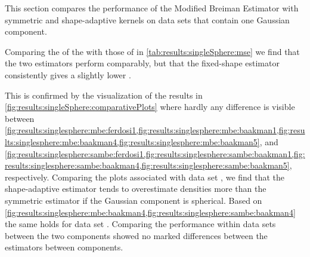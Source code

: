 
This section compares the performance of the Modified Breiman Estimator with symmetric and shape-adaptive kernels on data sets that contain one Gaussian component. 
	\begin{table}
		\centering
		
		\caption{Performance of the Modified Breiman Estimator with fixed-shaped and shape-adaptive kernels on the data sets with a single Gaussian component.} 	
		\label{tab:results:singleSphere:mse}
	\end{table}
	Comparing the \mses of the \mbe with those of \sambe in \cref{tab:results:singleSphere:mse} we find that the two estimators perform comparably, but that the fixed-shape estimator consistently gives a slightly lower \mse. 

	\begin{figure*}
		\centering
		
		\caption{The density as estimated by \mbe and \sambe as a function of the known density of data sets \ferdosiOne through \baakmanFive.}
		\label{fig:results:singleSphere:comparativePlots}
	\end{figure*}
	This is confirmed by the visualization of the results in \cref{fig:results:singleSphere:comparativePlots} where hardly any difference is visible between \cref{fig:results:singlesphere:mbe:ferdosi1,fig:results:singlesphere:mbe:baakman1,fig:results:singlesphere:mbe:baakman4,fig:results:singlesphere:mbe:baakman5}, and \cref{fig:results:singlesphere:sambe:ferdosi1,fig:results:singlesphere:sambe:baakman1,fig:results:singlesphere:sambe:baakman4,fig:results:singlesphere:sambe:baakman5}, respectively. 
		Comparing the plots associated with data set \ferdosiOne, we find that the shape-adaptive estimator tends to overestimate densities more than the symmetric estimator if the Gaussian component is spherical.
		Based on \cref{fig:results:singlesphere:mbe:baakman4,fig:results:singlesphere:sambe:baakman4} the same holds for data set \baakmanFour. 
	Comparing the performance within data sets between the two components showed no marked differences between the estimators between components.

